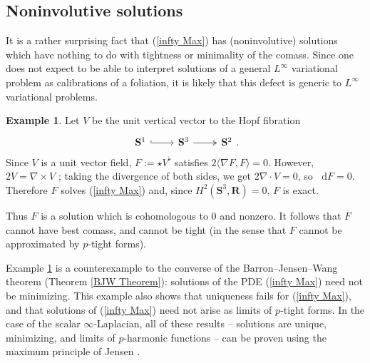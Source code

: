\documentclass[reqno,11pt]{amsart}
\newcommand{\RR}{\mathbf{R}}
\newcommand{\Sph}{\mathbf S}
\newcommand*\dif{\mathop{}\!\mathrm{d}}
\theoremstyle{definition}
\newtheorem{example}[theorem]{Example}
\numberwithin{equation}{section}
\begin{document}
\subsection{Noninvolutive solutions}
It is a rather surprising fact that (\ref{infty Max}) has (noninvolutive) solutions which have nothing to do with tightness or minimality of the comass.
Since one does not expect to be able to interpret solutions of a general $L^\infty$ variational problem as calibrations of a foliation, it is likely that this defect is generic to $L^\infty$ variational problems.

\begin{example}\label{integrability needed}
Let $V$ be the unit vertical vector to the Hopf fibration%
\[\begin{tikzcd}
	{\mathbf S^1} & {\mathbf S^3} & {\mathbf S^2}
	\arrow[hook, from=1-1, to=1-2]
	\arrow[two heads, from=1-2, to=1-3]
\end{tikzcd}.\]
Since $V$ is a unit vector field, $F := \star V^\flat$ satisfies $2\langle \nabla F, F\rangle = 0$.
However, $2V = \nabla \times V$ \cite[\S3]{Peralta_Salas_2023}; taking the divergence of both sides, we get $2 \nabla \cdot V = 0$, so $\dif F = 0$.
Therefore $F$ solves (\ref{infty Max}) and, since $H^2(\Sph^3, \RR) = 0$, $F$ is exact.

Thus $F$ is a solution which is cohomologous to $0$ and nonzero.
It follows that $F$ cannot have best comass, and cannot be tight (in the sense that $F$ cannot be approximated by $p$-tight forms).
\end{example}

Example \ref{integrability needed} is a counterexample to the converse of the Barron--Jensen--Wang theorem (Theorem \ref{BJW Theorem}): solutions of the PDE (\ref{infty Max}) need not be minimizing.
This example also shows that uniqueness fails for (\ref{infty Max}), and that solutions of (\ref{infty Max}) need not arise as limits of $p$-tight forms.
In the case of the scalar $\infty$-Laplacian, all of these results -- solutions are unique, minimizing, and limits of $p$-harmonic functions -- can be proven using the maximum principle of Jensen \cite{Jensen1993}.
\end{document}
